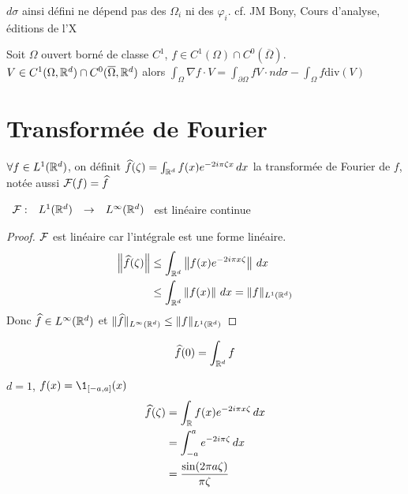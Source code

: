\documentclass[]{report}
\begin{document}
    \begin{re}{}{}
        $d\sigma$ ainsi défini ne dépend pas des $\Omega_i$ ni des $\varphi_i$. cf. JM Bony, Cours d'analyse, éditions de l'X
    \end{re}

    \begin{cor}{}{}
        Soit $\Omega$ ouvert borné de classe $C^1$, $f\in C^1(\Omega)\cap C^0(\overline{\Omega})$.\\
        $V\in C^1(\Omega,\mathbb{R}^d)\cap C^0(\overline{\Omega},\mathbb{R}^d)$ alors $\int_\Omega \nabla f\cdot V=\int_{\partial \Omega}f V\cdot n d\sigma- \int_\Omega f\text{div} (V)$
    \end{cor}

    \section{Transformée de Fourier}

    \begin{df}{}{}
        $\forall f\in L^1(\mathbb{R}^d)$, on définit $\widehat{f}(\zeta)=\int_{\mathbb{R}^d}f(x) e^{-2i\pi\zeta x}\, dx$ la transformée de Fourier de $f$, notée aussi $\mathcal{F}(f)=\widehat{f}$
    \end{df}

    \begin{prop}{}{}
        $\begin{array}{ccccc} \mathcal{F} : & L^1(\mathbb{R}^d) & \to & L^\infty(\mathbb{R}^d) \end{array}$ est linéaire continue
    \end{prop}

    \begin{proof}
        $\mathcal{F}$ est linéaire car l'intégrale est une forme linéaire.
        \begin{align*}
            \left\|\widehat{f}(\zeta)\right\|&\le \int_{\mathbb{R}^d}\left\|f(x)e^{-2i\pi x\zeta}\right\|\, dx\\
            &\le \int_{\mathbb{R}^d}\left\|f(x)\right\|\, dx=\lVert f \rVert_{L^1(\mathbb{R}^d)}
        \end{align*}
        Donc $\widehat{f}\in L^\infty(\mathbb{R}^d)$ et $\lVert \widehat{f} \rVert_{L^\infty(\mathbb{R}^d)}\le \lVert f \rVert_{L^1(\mathbb{R}^d)}$
    \end{proof}

    \begin{re}{}{}
        \[\widehat{f}(0)=\int_{\mathbb{R}^d}f\]
    \end{re}

    \begin{ex}{}{}
        $d=1$, $f(x)=\1_{[-a,a]}(x)$
        \begin{align*}
            \widehat{f}(\zeta)&=\int_{\mathbb{R}}f(x)e^{-2i\pi x\zeta}\, dx\\
            &=\int_{-a}^{a}e^{-2i\pi \zeta}\, dx\\
            &=\frac{\sin (2\pi a \zeta)}{\pi \zeta}
        \end{align*}
    \end{ex}
\end{document}
